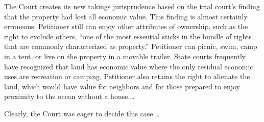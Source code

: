 %
%
%
The Court creates its new takings jurisprudence based on the trial court's
finding that the property had lost all economic value. This finding is almost
certainly erroneous. Petitioner still can enjoy other attributes of ownership,
such as the right to exclude others, ``one of the most essential sticks in the
bundle of rights that are commonly characterized as property.''
Petitioner can picnic, swim,
camp in a tent, or live on the property in a movable trailer. State courts
frequently have recognized that land has economic value where the only residual
economic uses are recreation or camping. Petitioner also retains the right to
alienate the land, which would have value for neighbors and for those prepared
to enjoy proximity to the ocean without a house.\ldots

Clearly, the Court was eager to decide this case.\ldots

